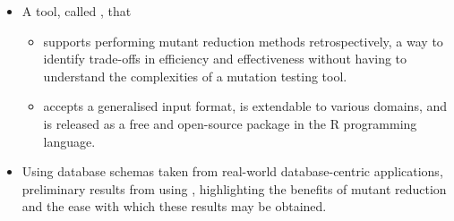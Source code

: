 \begin{itemize}





  \item A tool, called \mr, that

      \begin{itemize}
          \item supports performing mutant reduction methods retrospectively, a way to identify trade-offs
            in efficiency and effectiveness without having to understand the complexities of a mutation testing tool.

          \item accepts a generalised input format, is extendable to various domains, and is released as a free and open-source package in
            the R programming language.

    \end{itemize}


  \item Using database schemas taken from real-world database-centric applications, preliminary results from using
    \mr, highlighting the benefits of mutant reduction and the ease with which these results may be obtained.

\end{itemize}



